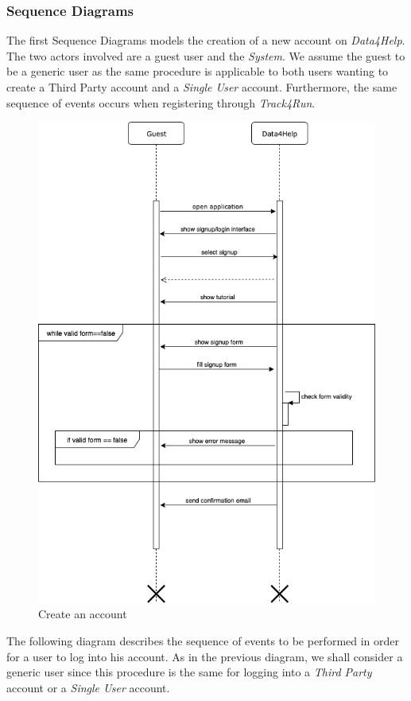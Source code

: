 \documentclass[titlepage]{article}
\begin{document}
			\subsubsection{Sequence Diagrams}
			The first Sequence Diagrams models the creation of a new account on {\it Data4Help}. The two actors involved are a guest user and the {\it System}. We assume the guest to be a generic user as the same procedure is applicable to both users wanting to create a Third Party account and a {\it Single User} account. Furthermore, the same sequence of events occurs when registering through {\it Track4Run}.
			\begin{figure}[H]
			\center
  			\includegraphics[width=\textwidth]{Diagrammi/sd1.png}
			\caption{Create an account}
			\label{fig:sd1}
		\end{figure} 		
The following diagram describes the sequence of events to be performed in order for a user to log into his account. As in the previous diagram, we shall consider a generic user since this procedure is the same for logging into a {\it Third Party} account or a {\it Single User} account. 
\end{document}
